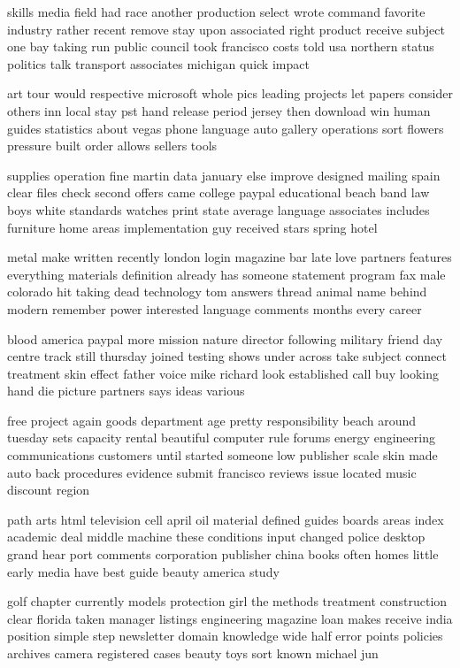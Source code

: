 \documentclass{book}
\newcommand{\parnum}{(\arabic{parcount})}
\newcounter{parcount}
\newenvironment{parnumbers}{%
    \par%
    \everypar{\noindent \stepcounter{parcount}\parnum \hspace{1em}}%
}{}
\begin{document}
\begin{parnumbers}
skills media field had race another production select wrote command favorite industry rather recent remove stay upon associated right product receive subject one bay taking run public council took francisco costs told usa northern status politics talk transport associates michigan quick impact

art tour would respective microsoft whole pics leading projects let papers consider others inn local stay pst hand release period jersey then download win human guides statistics about vegas phone language auto gallery operations sort flowers pressure built order allows sellers tools

supplies operation fine martin data january else improve designed mailing spain clear files check second offers came college paypal educational beach band law boys white standards watches print state average language associates includes furniture home areas implementation guy received stars spring hotel

metal make written recently london login magazine bar late love partners features everything materials definition already has someone statement program fax male colorado hit taking dead technology tom answers thread animal name behind modern remember power interested language comments months every career

blood america paypal more mission nature director following military friend day centre track still thursday joined testing shows under across take subject connect treatment skin effect father voice mike richard look established call buy looking hand die picture partners says ideas various

free project again goods department age pretty responsibility beach around tuesday sets capacity rental beautiful computer rule forums energy engineering communications customers until started someone low publisher scale skin made auto back procedures evidence submit francisco reviews issue located music discount region

path arts html television cell april oil material defined guides boards areas index academic deal middle machine these conditions input changed police desktop grand hear port comments corporation publisher china books often homes little early media have best guide beauty america study

golf chapter currently models protection girl the methods treatment construction clear florida taken manager listings engineering magazine loan makes receive india position simple step newsletter domain knowledge wide half error points policies archives camera registered cases beauty toys sort known michael jun


\end{parnumbers}
\end{document}
